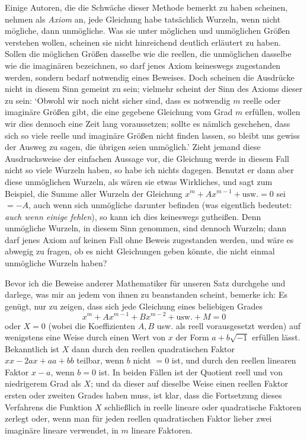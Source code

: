 Einige Autoren, die die Schwäche dieser Methode bemerkt zu haben scheinen, nehmen als \textit{Axiom} an, jede Gleichung habe tatsächlich Wurzeln, wenn nicht mögliche, dann unmögliche. Was sie unter möglichen und unmöglichen Größen verstehen wollen, scheinen sie nicht hinreichend deutlich erläutert zu haben. Sollen die möglichen Größen dasselbe wie die reellen, die unmöglichen dasselbe wie die imaginären bezeichnen, so darf jenes Axiom keineswegs zugestanden werden, sondern bedarf notwendig eines Beweises. Doch scheinen die Ausdrücke nicht in diesem Sinn gemeint zu sein; vielmehr scheint der Sinn des Axioms dieser zu sein: `Obwohl wir noch nicht sicher sind, dass es notwendig $m$ reelle oder imaginäre Größen gibt, die eine gegebene Gleichung vom Grad $m$ erfüllen, wollen wir dies dennoch eine Zeit lang voraussetzen; sollte es nämlich geschehen, dass sich so viele reelle und imaginäre Größen nicht finden lassen, so bleibt uns gewiss der Ausweg zu sagen, die übrigen seien unmöglich.' Zieht jemand diese Ausdrucksweise der einfachen Aussage vor, die Gleichung werde in diesem Fall nicht so viele Wurzeln haben, so habe ich nichts dagegen. Benutzt er dann aber diese unmöglichen Wurzeln, als wären sie etwas Wirkliches, und sagt zum Beispiel, die Summe aller Wurzeln der Gleichung $x^m+Ax^{m-1}+\text{usw.}=0$ sei $=-A$, auch wenn sich unmögliche darunter befinden (was eigentlich bedeutet: \textit{auch wenn einige fehlen}), so kann ich dies keineswegs gutheißen. Denn unmögliche Wurzeln, in diesem Sinn genommen, sind dennoch Wurzeln; dann darf jenes Axiom auf keinen Fall ohne Beweis zugestanden werden, und wäre es abwegig zu fragen, ob es nicht Gleichungen geben könnte, die nicht einmal unmögliche Wurzeln haben?

Bevor ich die Beweise anderer Mathematiker für unseren Satz durchgehe und darlege, was mir an jedem von ihnen zu beanstanden scheint, bemerke ich: Es genügt, nur zu zeigen, dass sich jede Gleichung eines beliebigen Grades
\[
x^m+Ax^{m-1}+Bx^{m-2}+\text{usw.}+M=0
\]
oder $X=0$ (wobei die Koeffizienten $A,B$ usw. als reell vorausgesetzt werden) auf wenigstens eine Weise durch einen Wert von $x$ der Form $a+b\sqrt{-1}$ erfüllen lässt. Bekanntlich ist $X$ dann durch den reellen quadratischen Faktor \mbox{$xx-2ax+aa+bb$} teilbar, wenn $b$ nicht $=0$ ist, und durch den reellen linearen Faktor $x-a$, wenn $b=0$ ist. In beiden Fällen ist der Quotient reell und von niedrigerem Grad als $X$; und da dieser auf dieselbe Weise einen reellen Faktor ersten oder zweiten Grades haben muss, ist klar, dass die Fortsetzung dieses Verfahrens die Funktion $X$ schließlich in reelle lineare oder quadratische Faktoren zerlegt oder, wenn man für jeden reellen quadratischen Faktor lieber zwei imaginäre lineare verwendet, in $m$ lineare Faktoren.
